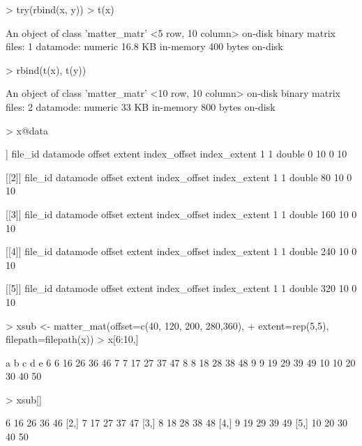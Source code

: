 \documentclass[a4paper]{article}
\begin{document}
\begin{Schunk}
\begin{Sinput}
> try(rbind(x, y))
> t(x)
\end{Sinput}
\begin{Soutput}
An object of class 'matter_matr'
  <5 row, 10 column> on-disk binary matrix
    files: 1
    datamode: numeric
    16.8 KB in-memory
    400 bytes on-disk
\end{Soutput}
\begin{Sinput}
> rbind(t(x), t(y))
\end{Sinput}
\begin{Soutput}
An object of class 'matter_matr'
  <10 row, 10 column> on-disk binary matrix
    files: 2
    datamode: numeric
    33 KB in-memory
    800 bytes on-disk
\end{Soutput}
\begin{Sinput}
> x@data
\end{Sinput}
\begin{Soutput}
[[1]]
  file_id datamode offset extent index_offset index_extent
1       1   double      0     10            0           10

[[2]]
  file_id datamode offset extent index_offset index_extent
1       1   double     80     10            0           10

[[3]]
  file_id datamode offset extent index_offset index_extent
1       1   double    160     10            0           10

[[4]]
  file_id datamode offset extent index_offset index_extent
1       1   double    240     10            0           10

[[5]]
  file_id datamode offset extent index_offset index_extent
1       1   double    320     10            0           10
\end{Soutput}
\begin{Sinput}
> xsub <- matter_mat(offset=c(40, 120, 200, 280,360),
+             extent=rep(5,5), filepath=filepath(x))
> x[6:10,]
\end{Sinput}
\begin{Soutput}
    a  b  c  d  e
6   6 16 26 36 46
7   7 17 27 37 47
8   8 18 28 38 48
9   9 19 29 39 49
10 10 20 30 40 50
\end{Soutput}
\begin{Sinput}
> xsub[]
\end{Sinput}
\begin{Soutput}
     [,1] [,2] [,3] [,4] [,5]
[1,]    6   16   26   36   46
[2,]    7   17   27   37   47
[3,]    8   18   28   38   48
[4,]    9   19   29   39   49
[5,]   10   20   30   40   50
\end{Soutput}
\end{Schunk}
\end{document}
